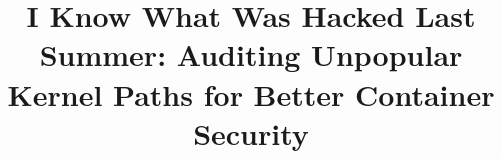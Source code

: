 \documentclass[sigplan,screen]{acmart}
\begin{document}
\renewcommand\footnotetextcopyrightpermission[1]{} %
\pagestyle{plain} %
%
\title{I Know What Was Hacked Last Summer: Auditing Unpopular Kernel Paths for Better Container Security}




\maketitle






%



%


\end{document}
